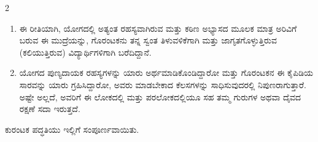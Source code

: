 \begin{multicols}{2}
\begin{kan}

\begin{enumerate}[nosep]
\item[24.] ಈ ರೀತಿಯಾಗಿ, ಯೋಗದಲ್ಲಿ ಅತ್ಯಂತ ರಹಸ್ಯವಾಗಿರುವ ಮತ್ತು ಕಠಿಣ ಅಭ್ಯಾಸದ ಮೂಲಕ ಮಾತ್ರ ಅರಿವಿಗೆ ಬರುವ ಈ ಮುದ್ರೆಯನ್ನು, ಗೊರಂಟಕನು ತನ್ನ ಸ್ವಂತ ತಿಳುವಳಿಕೆಗಾಗಿ ಮತ್ತು ಜಾಗೃತಗೊಳ್ಳುತ್ತಿರುವ (ಕಲಿಯುತ್ತಿರುವ) ವಿದ್ಯಾರ್ಥಿಗಳಿಗಾಗಿ ಬರೆದಿದ್ದಾನೆ.
\item[25.] ಯೋಗದ ಪುಣ್ಯದಾಯಕ ರಹಸ್ಯಗಳನ್ನು ಯಾರು ಅರ್ಥಮಾಡಿಕೊಂಡಿದ್ದಾರೋ ಮತ್ತು ಗೊರಂಟಕನ ಈ ಕೈಪಿಡಿಯ ಸಾರವನ್ನು ಯಾರು ಗ್ರಹಿಸಿದ್ದಾರೋ, ಅವರು ಮಾಡಬೇಕಾದ ಕೆಲಸಗಳನ್ನು ಸಾಧಿಸುವುದರಲ್ಲಿ ನಿಪುಣರಾಗುತ್ತಾರೆ. ಅಷ್ಟೇ ಅಲ್ಲದೆ, ಅವರಿಗೆ ಈ ಲೋಕದಲ್ಲಿ ಮತ್ತು ಪರಲೋಕದಲ್ಲಿಯೂ ಸಹ ತಮ್ಮ ಗುರುಗಳ ಅಥವಾ ದೈವದ ರಕ್ಷಣೆ ಸದಾ ಇರುತ್ತದೆ.
\end{enumerate}

ಕುರಂಟಕ ಪದ್ಧತಿಯು ಇಲ್ಲಿಗೆ ಸಂಪೂರ್ಣವಾಯಿತು.
\end{kan}
\end{multicols}
\vskip 1cm

\pushpika

